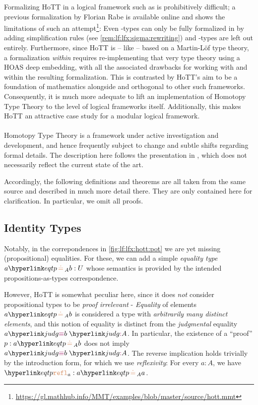 Formalizing HoTT in a logical framework such as \LF is prohibitively difficult; a previous formalization by Florian Rabe is available online and shows the limitations of such an attempt\footnote{\url{https://gl.mathhub.info/MMT/examples/blob/master/source/hott.mmt}}: Even \sigmasym-types can only be fully formalized in \LF by adding simplification rules (see \autoref{rem:lf:lfx:sigma:rewriting}) and \wtypesym-types are left out entirely. Furthermore, since HoTT is -- like \LF -- based on a Martin-Löf type theory, a formalization \emph{within} \LF requires re-implementing that very type theory using a HOAS deep embedding, with all the associated drawbacks for working with and within the resulting formalization. This is contrasted by HoTT's aim to be a foundation of mathematics alongside and orthogonal to other such frameworks. Consequently, it is much more adequate to lift an implementation of Homotopy Type Theory to the level of logical frameworks itself. Additionally, this makes HoTT an attractive case study for a modular logical framework.

\paragraph{} Homotopy Type Theory is a framework under active investigation and development, and hence frequently subject to change and subtle shifts regarding formal details. The description here follows the presentation in \cite{hottbook}, which does not necessarily reflect the current state of the art.

Accordingly, the following definitions and theorems are all taken from the same source and described in much more detail there. They are only contained here for clarification. In particular, we omit all proofs.

\subsection{Identity Types}\label{sec:lf:lfx:eq}

\hypertarget{eqtp}{Notably, in the correpondences in \autoref{fig:lf:lfx:hott:pot} we are yet missing (propositional) equalities. For these, we can add a simple \emph{equality type} $\eqtp abA:U$ whose semantics is provided by the intended propositions-as-types correspondence.}

However, HoTT is somewhat peculiar here, since it does \emph{not} consider propositional types to be \emph{proof irrelevant} - \emph{Equality} of elements $\eqtp abA$ is considered a type with \emph{arbitrarily many distinct elements}, and this notion of equality is distinct from the \emph{judgmental} equality $\judgeq abA$. In particular, the existence of a ``proof'' $p:\eqtp abA$ does not imply $\judgeq abA$. The reverse implication holds trivially by the introduction form, for which we use \emph{reflexivity}: For every $a:A$, we have $\refl a:\eqtp aaA$. 

